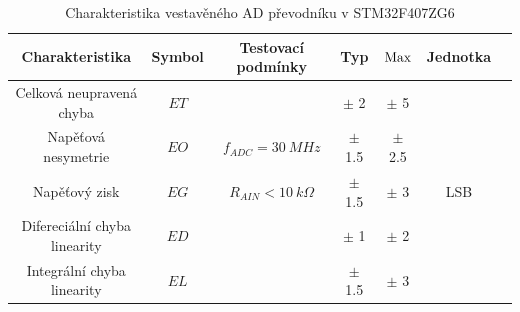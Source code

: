 \begin{table}[H]
    \label{tab:stm_adc_error}
    \caption{Charakteristika vestavěného AD převodníku v STM32F407ZG6}
    \hspace*{-1.3cm}
    \begin{ctucolortab}
        \begin{tabular}{ccccccc}
            \toprule
            Charakteristika               & Symbol & Testovací podmínky       & Typ       & $\textnormal{Max}$ & Jednotka & \\ \midrule
            Celková neupravená chyba      & $ET$   &                          & $\pm$ 2   & $\pm$ 5            &          & \\
            Napěťová nesymetrie           & $EO$   & $f_{ADC} = 30 \ MHz$     & $\pm$ 1.5 & $\pm$ 2.5          &          & \\
            Napěťový zisk                 & $EG$   & $R_{AIN} < 10 \ k\Omega$ & $\pm$ 1.5 & $\pm$ 3            & LSB      & \\
            Difereciální  chyba linearity & $ED$   &                          & $\pm$ 1   & $\pm$ 2            &          & \\
            Integrální chyba linearity    & $EL$   &                          & $\pm$ 1.5 & $\pm$ 3            &          & \\
            \bottomrule
        \end{tabular}
    \end{ctucolortab}
\end{table}

